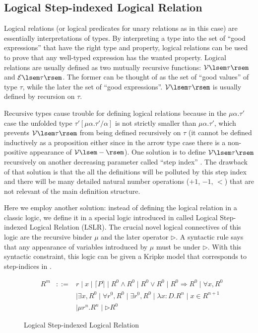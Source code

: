 \documentclass[preprint]{sigplanconf}
\newcommand{\relV}[1]{\mathcal{V}\lsem#1\rsem}
\newcommand{\relE}[1]{\mathcal{E}\lsem#1\rsem}
\newcommand{\later}{\triangleright}
\begin{document}
\subsection {Logical Step-indexed Logical Relation}

Logical relations (or logical predicates for unary relations as in this case) are essentially interpretations of types. By interpreting a type into the set of ``good expressions'' that have the right type and property, logical relations can be used to prove that any well-typed expression has the wanted property. Logical relations are usually defined as two mutually recursive functions: $\relV{\tau}$ and $\relE{\tau}$. The former can be thought of as the set of ``good values'' of type $\tau$, while the later the set of ``good expressions''. $\relV{\tau}$ is usually defined by recursion on $\tau$.

Recursive types cause trouble for defining logical relations because in the $\mu\alpha.\tau'$ case the unfolded type $\tau'[\mu\alpha.\tau'/\alpha]$ is not strictly smaller than $\mu\alpha.\tau'$, which prevents $\relV{\tau}$ from being defined recursively on $\tau$ (it cannot be defined inductively as a proposition either since in the arrow type case there is a non-positive appearance of $\relV{-}$). One solution is to define $\relV{\tau}$ recursively on another decreasing parameter called ``step index'' \cite{ahmed2006step}. The drawback of that solution is that the all the definitions will be polluted by this step index and there will be many detailed natural number operations ($+1$, $-1$, $<$) that are not relevant of the main definition structure. 

Here we employ another solution: instead of defining the logical relation in a classic logic, we define it in a special logic introduced in \cite{dreyer2009logical} called Logical Step-indexed Logical Relation (LSLR). The crucial novel logical connectives of this logic are the recursive binder $\mu$ and the later operator $\later$. A syntactic rule says that any appearance of variables introduced by $\mu$ must be under $\later$. With this syntactic constraint, this logic can be given a Kripke model that corresponds to step-indices in \cite{ahmed2006step}. 

\begin{figure}
  $$\begin{array}{rrcl}
    & R^m &::=& r \mid x \mid \lceil P \rceil \mid R^0 \wedge R^0 \mid R^0 \vee R^0 \mid R^0 \Rightarrow R^0 \mid \forall x,R^0 \\ 
    & & & \mid \exists x,R^0 \mid \forall r^0,R^0 \mid \exists r^0,R^0 \mid \lambda x:D.R^n \mid x\in R^{n+1} \\
    & & & \mid \mu r^n. R^n \mid \later R^0
  \end{array}$$
  \caption{\label{lslr}Logical Step-indexed Logical Relation}
\end{figure}
\end{document}
